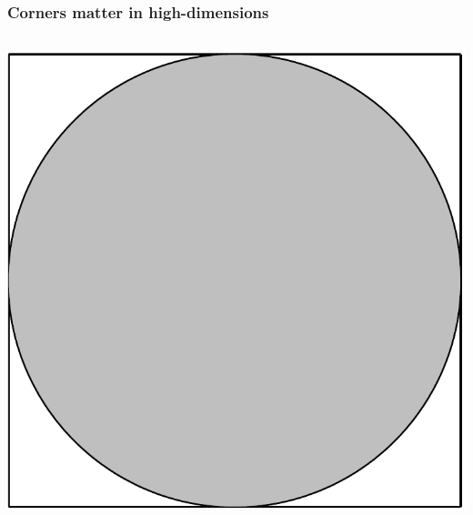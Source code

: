 \begin{frame}
\frametitle{Corners matter in high-dimensions}
\begin{columns}[c]
\includegraphics[width=.8\textwidth]{circle}


\end{columns}
\end{frame}
